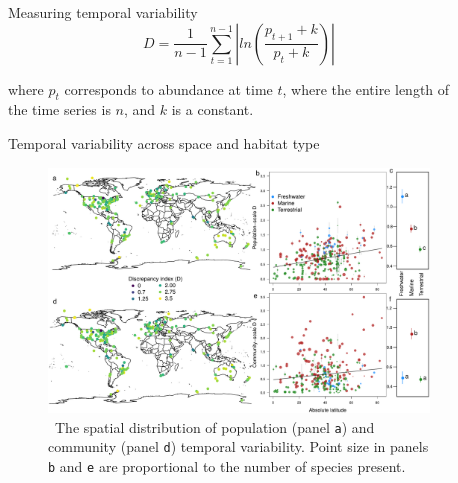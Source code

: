 \documentclass[final,hyperref={pdfpagelabels=false}]{beamer}
\begin{document}
\begin{frame}[t]
\begin{columns}[t]
\begin{column}{0.46\textwidth}
\end{column} 







\begin{column}{0.02\textwidth}\end{column} %






\begin{column}{0.46\textwidth} 



\begin{exampleblock}{Measuring temporal variability}
\begin{equation}
  D = \frac{1}{n-1} \sum_{t=1}^{n-1} \left\lvert ln\left( \frac{p_{t+1}+k}{p_{t}+k}\right)\right\rvert
\end{equation}

\vspace{0.5cm}
where $p_{t}$ corresponds to abundance at time $t$, where the entire length of the time series is $n$, and $k$ is a constant.

\end{exampleblock}




\begin{alertblock}{Temporal variability across space and habitat type}

		\begin{figure}
			\includegraphics[width=\linewidth]{figures/stabilityMapD.pdf}
			\caption{ \ The spatial distribution of population (panel \texttt{a}) and community (panel \texttt{d}) temporal variability. Point size in panels \texttt{b} and \texttt{e} are proportional to the number of species present.}
		\end{figure}
\end{alertblock}



\end{column}
\end{columns}
\end{frame}
\end{document}
